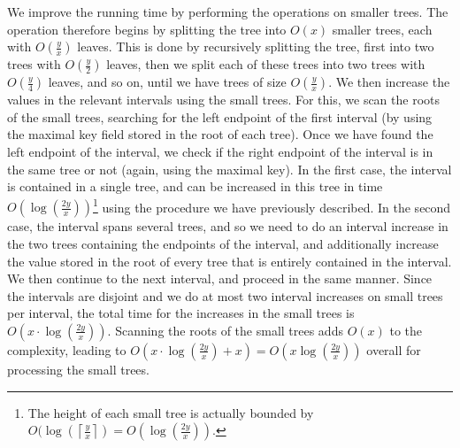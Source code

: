 \documentclass[11pt,a4paper]{article}
\newcommand{\ceil}[1]{\left\lceil #1 \right\rceil}
\theoremstyle{definition}
\theoremstyle{remark}
\begin{document}
We improve the running time by performing the operations on smaller trees. The operation therefore begins by splitting the tree into $O(x)$ smaller trees, each with $O(\frac{y}{x})$ leaves. This is done by recursively splitting the tree, first into two trees with $O(\frac{y}{2})$ leaves, then we split each of these trees into two trees with $O(\frac{y}{4})$ leaves, and so on, until we have trees of size $O(\frac{y}{x})$. We then increase the values in the relevant intervals using the small trees. For this, we scan the roots of the small trees, searching for the left endpoint of the first interval (by using the maximal key field stored in the root of each tree). Once we have found the left endpoint of the interval, we check if the right endpoint of the interval is in the same tree or not (again, using the maximal key). In the first case, the interval is contained in a single tree, and can be increased in this tree in time $O(\log(\frac{2y}{x}))$\footnote{The height of each small tree is actually bounded by $O(\log (\ceil{\frac{y}{x}}) = O(\log (\frac{2y}{x}))$.} using the procedure we have previously described. In the second case, the interval spans several trees, and so we need to do an interval increase in the two trees containing the endpoints of the interval, and additionally increase the value stored in the root of every tree that is entirely contained in the interval. We then continue to the next interval, and proceed in the same manner. 
%
Since the intervals are disjoint and we do at most two interval increases on small trees per interval, the total time for the increases in the small trees is $O(x \cdot \log (\frac{2y}{x}))$. Scanning the roots of the small trees adds $O(x)$ to the complexity, leading to 
 $O(x \cdot \log (\frac{2y}{x}) + x) = O(x \log (\frac{2y}{x}))$ overall for processing the small trees.
\end{document}
